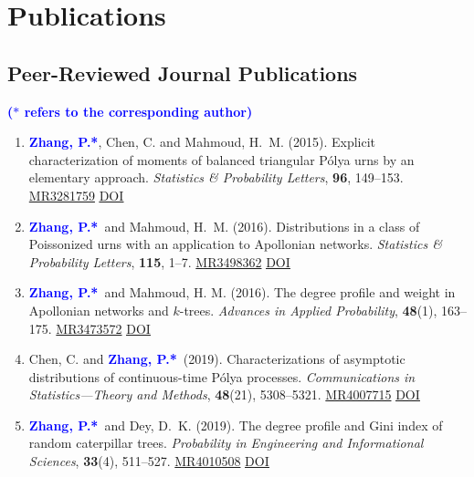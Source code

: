 \documentclass[12pt]{article}
\def\MR#1{\href{http://www.ams.org/mathscinet-getitem?mr=#1}{MR#1}}
\newcommand{\PZ}{\textcolor{blue}{\textbf{Zhang, P.*}}}
\begin{document}
	\section*{Publications}
	\subsection*{Peer-Reviewed Journal Publications}
	
	{\bf \textcolor{blue}{($\ast$ refers to the corresponding author)}}
	
	\noindent {\bf \textcolor{brown}{($\dagger$ refers to my 
	students, postdocs or trainees)}}
	
	\begin{enumerate}
		\item \PZ, {\sc Chen, C.} and {\sc Mahmoud, H.\ M.} 
		(2015). Explicit characterization of moments of balanced 
		triangular P\'{o}lya urns by an elementary approach. 
		\emph{Statistics \& Probability Letters}, {\bf 96}, 149--153. \MR{3281759} \href{https://doi.org/10.1016/j.spl.2014.09.016}
		{\underline{DOI}}
		
		\item \PZ\ and {\sc Mahmoud, H.\ M.} (2016). 
		Distributions in a class of Poissonized urns with an application to Apollonian networks. \emph{Statistics \& Probability Letters}, {\bf 115}, 1--7. \MR{3498362}
		\href{https://doi.org/10.1016/j.spl.2016.03.023}
		{\underline{DOI}}
		
		\item \PZ\ and {\sc Mahmoud, H. M.} (2016). The 
		degree profile and weight in Apollonian networks and $k$-trees. {\em Advances in Applied Probability}, \textbf{48}(1), 163--175. \MR{3473572}
		\href{https://doi.org/10.1017/apr.2015.11}
		{\underline{DOI}}
		
		\item {\sc Chen, C.} and \PZ\ (2019). Characterizations of 
		asymptotic distributions of continuous-time P\'{o}lya processes. {\em Communications in Statistics---Theory and Methods}, \textbf{48}(21), 5308--5321. \MR{4007715}
		\href{https://doi.org/10.1080/03610926.2018.1510005}
		{\underline{DOI}}
		
		\item \PZ\ and {\sc Dey, D.\ K.} (2019). The degree 
		profile and Gini index of random caterpillar trees. {\em 
		Probability in Engineering and Informational Sciences}, 
		\textbf{33}(4), 511--527. \MR{4010508}
		\href{https://doi.org/10.1017/S0269964818000475}
		{\underline{DOI}}
		

\end{enumerate}
\end{document}
